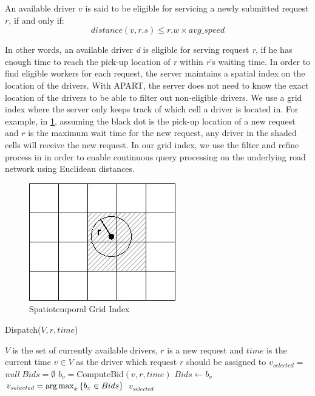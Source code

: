 \begin{definition} 
An available driver $v$ is said to be eligible for servicing a newly submitted request $r$, if and only if:
\begin{equation*}
distance(v, r.s) \leq r.w \times avg\_speed
\end{equation*}
\end{definition}

\noindent In other words, an available driver \textit{d} is eligible for serving request \textit{r}, if he has enough time to reach the pick-up location of \textit{r} within \textit{r}'s waiting time. In order to find eligible workers for each request, the server maintains a spatial index on the location of the drivers. With APART, the server does not need to know the exact location of the drivers to be able to filter out non-eligible drivers. We use a grid index where the server only keeps track of which cell a driver is located in. For example, in \cref{fig:grid_index}, assuming the black dot is the pick-up location of a new request and $r$ is the maximum wait time for the new request, any driver in the shaded cells will receive the new request. In our grid index, we use the filter and refine process in \cite{Demiryurek09} in order to enable continuous query processing on the underlying road network using Euclidean distances.

\begin{figure}[!ht]
	\centering
	\includegraphics[width=0.45\columnwidth]{fig/grid_index.jpg}
	\vspace{-0mm}\caption{Spatiotemporal Grid Index} \vspace{-2mm} \label{fig:grid_index}
\end{figure}\vspace{-0mm}

\begin{algorithm}
\caption{Dispatch($V, r, time$)}
\label{algo:dispatch}
\begin{algorithmic}[1]
\REQUIRE $V$ is the set of currently available drivers, $r$ is a new request and $time$ is the current time
\ENSURE $v \in V$ as the driver which request $r$ should be assigned to
\STATE $v_{selected} = $ \emph{null}
\STATE $Bids = \emptyset$
 \label{line:loop_start}
	\STATE $b_v = $ComputeBid$(v, r, time)$ \label{line:compute}
	\STATE $Bids \leftarrow  b_v$
\ENDFOR \label{line:loop_end}
\STATE $v_{selected} = \operatorname*{arg\,max}_x \left\lbrace b_x \in Bids \right\rbrace$ \label{line:select}
\RETURN $v_{selected}$
\end{algorithmic}
\end{algorithm}

